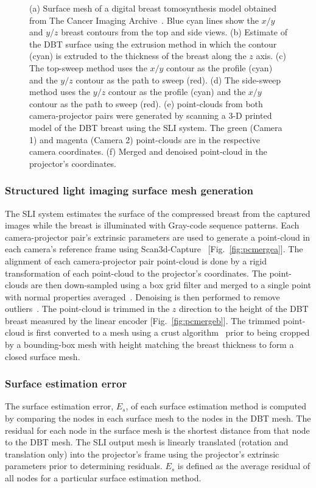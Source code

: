 \begin{figure}
\begin{center}
	\end{center}
	\caption{(a) Surface mesh of a digital breast tomosynthesis model obtained from The Cancer Imaging Archive~\cite{Clark2013}. Blue cyan lines show the $x/y$ and $y/z$ breast contours from the top and side views. (b) Estimate of the DBT surface using the extrusion method in which the contour (cyan) is extruded to the thickness of the breast along the $z$ axis. (c) The top-sweep method uses the $x/y$ contour as the profile (cyan) and the $y/z$ contour as the path to sweep (red). (d) The side-sweep method uses the $y/z$ contour as the profile (cyan) and the $x/y$ contour as the path to sweep (red). (e) point-clouds from both camera-projector pairs were generated by scanning a 3-D printed model of the DBT breast using the SLI system. The green (Camera 1) and magenta (Camera 2) point-clouds are in the respective camera coordinates. (f) Merged and denoised point-cloud in the projector's coordinates.} 
	\label{fig:meshes}
\end{figure} 

\subsubsection{Structured light imaging surface mesh generation}
The SLI system estimates the surface of the compressed breast from the captured images while the breast is illuminated with Gray-code sequence patterns. Each camera-projector pair's extrinsic parameters are used to generate a point-cloud in each camera's reference frame using Scan3d-Capture~\cite{Moreno2012a} [Fig.~\ref{fig:pcmergea}]. The alignment of each camera-projector pair point-cloud is done by a rigid transformation of each point-cloud to the projector's coordinates. The point-clouds are then down-sampled using a box grid filter and merged to a single point with normal properties averaged~\cite{Pomerleau2013}. Denoising is then performed to remove outliers~\cite{Rusu2008}. The point-cloud is trimmed in the $z$ direction to the height of the DBT breast measured by the linear encoder [Fig.~\ref{fig:pcmergeb}]. The trimmed point-cloud is first converted to a mesh using a crust algorithm~\cite{Crust1999} prior to being cropped by a bounding-box mesh with height matching the breast thickness to form a closed surface mesh. 

\subsubsection{Surface estimation error}
The surface estimation error, $E_s$, of each surface estimation method is computed by comparing the nodes in each surface mesh to the nodes in the DBT mesh. The residual for each node in the surface mesh is the shortest distance from that node to the DBT mesh. The SLI output mesh is linearly translated (rotation and translation only) into the projector's frame using the projector's extrinsic parameters prior to determining residuals. $E_s$ is defined as the average residual of all nodes for a particular surface estimation method. 

